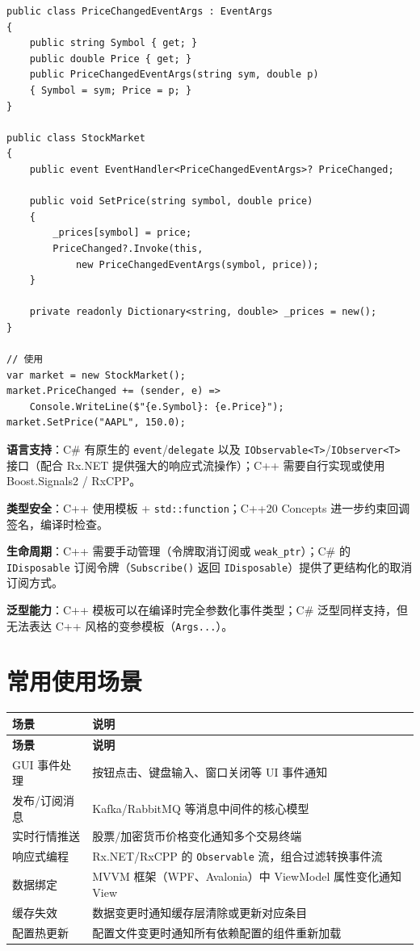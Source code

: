 \documentclass[12pt,a4paper,fontset=fandol]{ctexbook}
\begin{document}
\begin{lstlisting}[style=csharpstyle, caption={观察者模式 --- C\# 事件}]
public class PriceChangedEventArgs : EventArgs
{
    public string Symbol { get; }
    public double Price { get; }
    public PriceChangedEventArgs(string sym, double p)
    { Symbol = sym; Price = p; }
}

public class StockMarket
{
    public event EventHandler<PriceChangedEventArgs>? PriceChanged;

    public void SetPrice(string symbol, double price)
    {
        _prices[symbol] = price;
        PriceChanged?.Invoke(this,
            new PriceChangedEventArgs(symbol, price));
    }

    private readonly Dictionary<string, double> _prices = new();
}

// 使用
var market = new StockMarket();
market.PriceChanged += (sender, e) =>
    Console.WriteLine($"{e.Symbol}: {e.Price}");
market.SetPrice("AAPL", 150.0);
\end{lstlisting}

\begin{compare}
\textbf{语言支持}：C\# 有原生的 \texttt{event}/\allowbreak{}\texttt{delegate} 以及 \texttt{IObservable<T>}/\allowbreak{}\texttt{IObserver<T>} 接口（配合 Rx.NET 提供强大的响应式流操作）；C++ 需要自行实现或使用 Boost.Signals2 / RxCPP。

\textbf{类型安全}：C++ 使用模板 + \texttt{std::function}；C++20 Concepts 进一步约束回调签名，编译时检查。

\textbf{生命周期}：C++ 需要手动管理（令牌取消订阅或 \texttt{weak\_ptr}）；C\# 的 \texttt{IDisposable} 订阅令牌（\texttt{Subscribe()} 返回 \texttt{IDisposable}）提供了更结构化的取消订阅方式。

\textbf{泛型能力}：C++ 模板可以在编译时完全参数化事件类型；C\# 泛型同样支持，但无法表达 C++ 风格的变参模板（\texttt{Args...}）。
\end{compare}

\section{常用使用场景}

\begin{longtable}{p{4.5cm} p{8.5cm}}
\toprule
\textbf{场景} & \textbf{说明} \\
\midrule
\endfirsthead
\toprule
\textbf{场景} & \textbf{说明} \\
\midrule
\endhead
\bottomrule
\endfoot
GUI 事件处理 & 按钮点击、键盘输入、窗口关闭等 UI 事件通知 \\
发布/订阅消息 & Kafka/RabbitMQ 等消息中间件的核心模型 \\
实时行情推送 & 股票/加密货币价格变化通知多个交易终端 \\
响应式编程 & Rx.NET/RxCPP 的 \texttt{Observable} 流，组合过滤转换事件流 \\
数据绑定 & MVVM 框架（WPF、Avalonia）中 ViewModel 属性变化通知 View \\
缓存失效 & 数据变更时通知缓存层清除或更新对应条目 \\
配置热更新 & 配置文件变更时通知所有依赖配置的组件重新加载 \\
\end{longtable}
\end{document}
